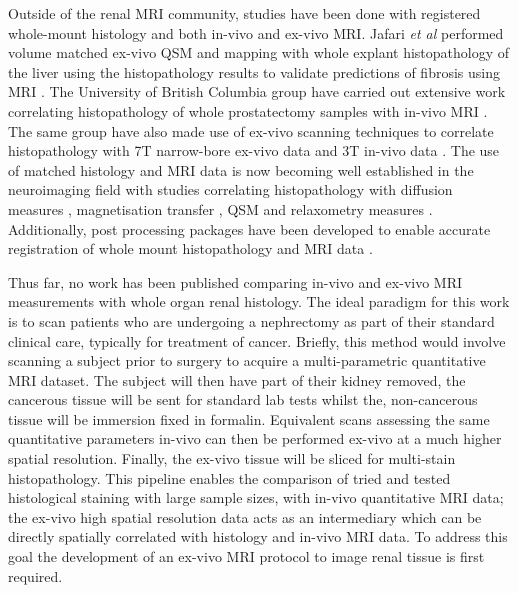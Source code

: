 Outside of the renal \ac{MRI} community, studies have been done with registered whole-mount histology and both in-vivo and ex-vivo \ac{MRI}. Jafari \textit{et al} performed volume matched ex-vivo \ac{QSM} and \ttwostar mapping with whole explant histopathology of the liver using the histopathology results to validate predictions of fibrosis using \ac{MRI} \cite{jafari_integrated_2021}. The University of British Columbia group have carried out extensive work correlating histopathology of whole prostatectomy samples with in-vivo \ac{MRI} \cite{sabouri_mr_2017, dhatt_mri_2020}. The same group have also made use of ex-vivo scanning techniques to correlate histopathology with 7T narrow-bore ex-vivo data and 3T in-vivo data \cite{uribe_vivo_2015}. The use of matched histology and \ac{MRI} data is now becoming well established in the neuroimaging field \cite{lazari_can_2021} with studies correlating histopathology with diffusion measures \cite{peters_white_2019, moll_multiple_2011, howard_joint_2019, mollink_white_2019}, magnetisation transfer \cite{mottershead_high_2003, seewann_diffusely_2009}, \ac{QSM} \cite{hametner_influence_2018, stuber_myelin_2014} and relaxometry measures \cite{bagnato_untangling_2018, reeves_combined_2016}. Additionally, post processing packages have been developed to enable accurate registration of whole mount histopathology and \ac{MRI} data \cite{huszar_tensor_2019, huszar_automated_2019}.

Thus far, no work has been published comparing in-vivo and ex-vivo \ac{MRI} measurements with whole organ renal histology. The ideal paradigm for this work is to scan patients who are undergoing a nephrectomy as part of their standard clinical care, typically for treatment of cancer. Briefly, this method would involve scanning a subject prior to surgery to acquire a multi-parametric quantitative \ac{MRI} dataset. The subject will then have part of their kidney removed, the cancerous tissue will be sent for standard lab tests whilst the, non-cancerous tissue will be immersion fixed in formalin. Equivalent scans assessing the same quantitative parameters in-vivo can then be performed ex-vivo at a much higher spatial resolution. Finally, the ex-vivo tissue will be sliced for multi-stain histopathology. This pipeline enables the comparison of tried and tested histological staining with large sample sizes, with in-vivo quantitative \ac{MRI} data; the ex-vivo high spatial resolution data acts as an intermediary which can be directly spatially correlated with histology and in-vivo \ac{MRI} data. To address this goal the development of an ex-vivo \ac{MRI} protocol to image renal tissue is first required.

